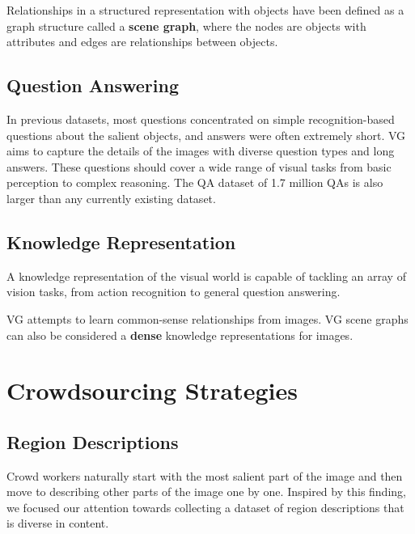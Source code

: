 \documentclass[10pt]{article}
\begin{document}
Relationships in a structured representation with objects have been defined as
a graph structure called a \textbf{scene graph}, where the nodes are objects
with attributes and edges are relationships between objects. 

\subsection{Question Answering}%
\label{sec:qa}
In previous datasets, most questions concentrated on simple recognition-based
questions about the salient objects, and answers were often extremely short.
VG aims to capture the details of the images with diverse question types and
long answers. These questions should cover a wide range of visual tasks from
basic perception to complex reasoning. The QA dataset of 1.7 million QAs is
also larger than any currently existing dataset.

\subsection{Knowledge Representation}%
\label{sec:knowledge}
A knowledge representation of the visual world is capable of tackling an array
of vision tasks, from action recognition to general question answering.

VG attempts to learn common-sense relationships from images. VG scene graphs
can also be considered a \textbf{dense} knowledge representations for images.

\section{Crowdsourcing Strategies}%
\label{sec:crowdsourcing}
\setcounter{subsection}{1}
\subsection{Region Descriptions}%
\label{sec:region}
Crowd workers naturally start with the most salient part of the image and then
move to describing other parts of the image one by one. Inspired by this
finding, we focused our attention towards collecting a dataset of region
descriptions that is diverse in content.
\end{document}
